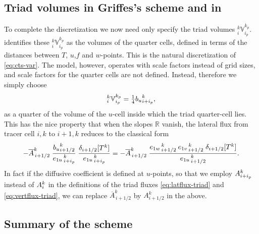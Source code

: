 \documentclass[../main/NEMO_manual]{subfiles}
\begin{document}
\subsection{Triad volumes in Griffes's scheme and in \NEMO}

To complete the discretization we now need only specify the triad volumes $_i^k\mathbb{V}_{i_p}^{k_p}$.
\citet{Griffies_al_JPO98} identifies these $_i^k\mathbb{V}_{i_p}^{k_p}$ as the volumes of the quarter cells,
defined in terms of the distances between $T$, $u$,$f$ and $w$-points.
This is the natural discretization of \autoref{eq:cts-var}.
The \NEMO model, however, operates with scale factors instead of grid sizes,
and scale factors for the quarter cells are not defined.
Instead, therefore we simply choose
\begin{equation}
  \label{eq:V-NEMO}
  _i^k\mathbb{V}_{i_p}^{k_p}=\textstyle\frac{1}{4} {b_u}_{i+i_p}^k,
\end{equation}
as a quarter of the volume of the $u$-cell inside which the triad quarter-cell lies.
This has the nice property that when the slopes $\mathbb{R}$ vanish,
the lateral flux from tracer cell $i,k$ to $i+1,k$ reduces to the classical form
\begin{equation}
  \label{eq:lat-normal}
  -\overline{{A}}_{\,i+1/2}^k\;
  \frac{{b_u}_{i+1/2}^k}{{e_{1u}}_{\,i + i_p}^{\,k}}
  \;\frac{\delta_{i+ 1/2}[T^k] }{{e_{1u}}_{\,i + i_p}^{\,k}}
  = -\overline{{A}}_{\,i+1/2}^k\;\frac{{e_{1w}}_{\,i + 1/2}^{\,k}\:{e_{1v}}_{\,i + 1/2}^{\,k}\;\delta_{i+ 1/2}[T^k]}{{e_{1u}}_{\,i + 1/2}^{\,k}}.
\end{equation}
In fact if the diffusive coefficient is defined at $u$-points,
so that we employ ${A}_{i+i_p}^k$ instead of  ${A}_i^k$ in the definitions of the triad fluxes
\autoref{eq:latflux-triad} and \autoref{eq:vertflux-triad},
we can replace $\overline{A}_{\,i+1/2}^k$ by $A_{i+1/2}^k$ in the above.

\subsection{Summary of the scheme}
\end{document}
